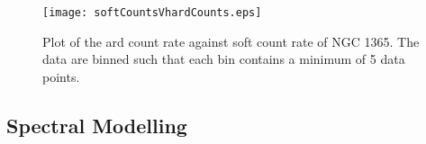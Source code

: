 \documentclass[useAMS,usenatbib]{sam}
\begin{document}
\begin{figure}
	\texttt{[image: softCountsVhardCounts.eps]}
	\caption{Plot of the ard count rate against soft count rate of NGC 1365. The data are binned such that each bin contains a minimum of 5 data points.}
	\label{counts}
\end{figure}

\subsection{Spectral Modelling}
\end{document}
